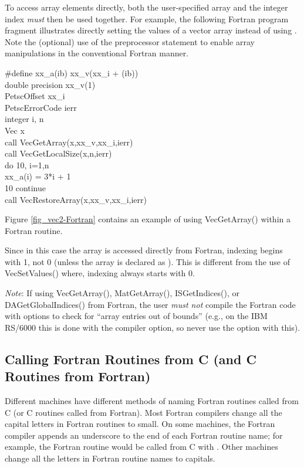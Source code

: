 To access array elements directly, both the user-specified array and
the integer index {\em must} then be used together.  
For example, the following Fortran program fragment illustrates
directly setting the values of a vector array instead of using .  Note the (optional) use of the preprocessor 
 statement to enable array manipulations in the conventional
Fortran manner.
\begin{tabbing}
   \#define xx\_a(ib)  xx\_v(xx\_i + (ib))\\

    double precision xx\_v(1)\\
    PetscOffset      xx\_i\\
    PetscErrorCode ierr\\
    integer          i, n\\
    Vec              x\\
    call VecGetArray(x,xx\_v,xx\_i,ierr)\\
    call VecGetLocalSize(x,n,ierr)\\
    do 10, i=1,n\\
       xx\_a(i) = 3*i + 1\\
 10 continue\\
    call VecRestoreArray(x,xx\_v,xx\_i,ierr)
\end{tabbing}
Figure \ref{fig_vec2-Fortran} contains an example of using VecGetArray()
within a Fortran routine.

Since in this case the array is accessed directly from Fortran,
indexing begins with 1, not 0 (unless the array is declared as ).
This is different from the use of VecSetValues()
where, indexing always starts with 0.

{\em Note}: If using VecGetArray(), MatGetArray(), ISGetIndices(),
or DAGetGlobalIndices()
from Fortran, the user {\em must not} compile the Fortran code with options 
to check for ``array entries out of bounds'' (e.g., on the IBM RS/6000 this 
is done with the  compiler option, so never use the  option with this).

\subsection{Calling Fortran Routines from C (and C Routines from Fortran)}


Different machines have
different methods of naming Fortran routines called from C 
(or C routines called from Fortran). Most Fortran compilers change
all the capital letters in Fortran routines to small. On some machines, the 
Fortran compiler appends an underscore to the end of each Fortran 
routine name; for example, the Fortran routine 
would be called from C with .  Other machines
change all the letters in Fortran routine names to capitals. 


